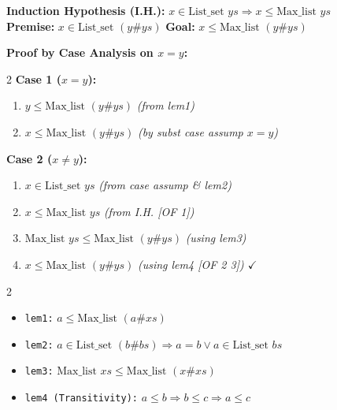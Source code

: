 \documentclass[10pt,a4paper]{article}
\begin{document}
\begin{tcolorbox}[title={Step Case ($xs \to y \mathbin{\#} ys$)}]
\textbf{Induction Hypothesis (I.H.):} $x \in \text{List\_set } ys \Longrightarrow x \le \text{Max\_list } ys$ \\
\textbf{Premise:} $x \in \text{List\_set } (y \# ys)$ \qquad \textbf{Goal:} $x \le \text{Max\_list } (y \# ys)$

\vspace{0.3em}
\textbf{Proof by Case Analysis on $x = y$:}

\begin{multicols}{2}
\textbf{Case 1 ($x = y$):}
\begin{enumerate}[leftmargin=1.2em, itemsep=2pt]
    \item $y \le \text{Max\_list } (y \# ys)$ \quad \textit{(from lem1)}
    \item $x \le \text{Max\_list } (y \# ys)$ \quad \textit{(by subst case assump $x=y$)}
\end{enumerate}

\columnbreak

\textbf{Case 2 ($x \neq y$):}
\begin{enumerate}[leftmargin=1.2em, itemsep=2pt]
    \item $x \in \text{List\_set } ys$ \quad \textit{(from case assump \& lem2)}
    \item $x \le \text{Max\_list } ys$ \quad \textit{(from I.H. [OF 1])}
    \item $\text{Max\_list } ys \le \text{Max\_list } (y \# ys)$ \quad \textit{(using lem3)}
    \item $x \le \text{Max\_list } (y \# ys)$ \quad \textit{(using lem4 [OF 2 3]) $\checkmark$}
\end{enumerate}
\end{multicols}
\end{tcolorbox}

\vspace{0.3em}

\begin{tcolorbox}[title={Auxiliary Lemmas Used in Proof}]
\begin{multicols}{2}
\begin{itemize}[leftmargin=1.2em, itemsep=2pt]
    \item \texttt{lem1:} $a \le \text{Max\_list } (a \# xs)$
    \item \texttt{lem2:} $a \in \text{List\_set } (b \# bs) \Longrightarrow a = b \lor a \in \text{List\_set } bs$
\end{itemize}
\columnbreak
\begin{itemize}[leftmargin=1.2em, itemsep=2pt]
    \item \texttt{lem3:} $\text{Max\_list } xs \le \text{Max\_list } (x \# xs)$
    \item \texttt{lem4 (Transitivity):} $a \le b \Longrightarrow b \le c \Longrightarrow a \le c$
\end{itemize}
\end{multicols}
\end{tcolorbox}
\end{document}
